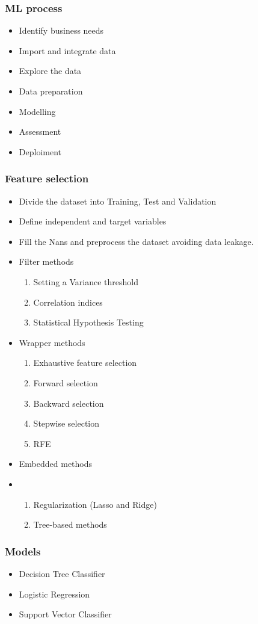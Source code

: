 \subsubsection{ML process}

\begin{itemize}
    \item Identify business needs
    \item Import and integrate data
    \item Explore the data
    \item Data preparation
    \item Modelling
    \item Assessment
    \item Deploiment
\end{itemize}


\subsubsection{Feature selection}

\begin{itemize}
    \item Divide the dataset into Training, Test and Validation
    \item Define independent and target variables
    \item Fill the Nans and preprocess the dataset avoiding data leakage.
    \item Filter methods 
    \begin{enumerate}
        \item Setting a Variance threshold
        \item Correlation indices
        \item Statistical Hypothesis Testing
    \end{enumerate}
    \item Wrapper methods
    \begin{enumerate}
        \item Exhaustive feature selection
        \item Forward selection
        \item Backward selection
        \item Stepwise selection
        \item RFE
    \end{enumerate}
    \item Embedded methods
    \item \begin{enumerate}
        \item Regularization (Lasso and Ridge)
        \item Tree-based methods
    \end{enumerate}
\end{itemize}



\subsubsection{Models}

\begin{itemize}
    \item Decision Tree Classifier
    \item Logistic Regression
    \item Support Vector Classifier
\end{itemize}